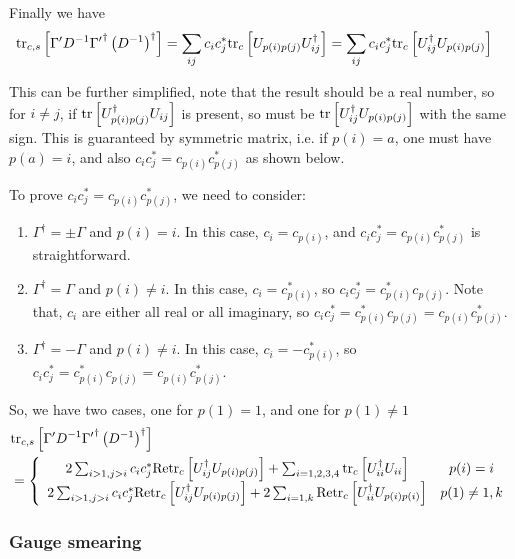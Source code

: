 Finally we have
\begin{equation}
\begin{split}
&{\rm tr}_{c,s}\left[\Gamma ' D^{-1}{\Gamma '}^{\dagger}\left(D^{-1}\right)^{\dagger}\right] = \sum _{ij}c_ic_j^* {\rm tr}_c\left[U_{p(i)p(j)}U^{\dagger}_{ij}\right]=\sum _{ij}c_ic_j^* {\rm tr}_c\left[U^{\dagger}_{ij}U_{p(i)p(j)}\right]
\end{split}
\end{equation}

This can be further simplified, note that the result should be a real number, so for $i\neq j$, if ${\rm tr}\left[U^{\dagger}_{p(i)p(j)}U_{ij}\right]$ is present, so must be ${\rm tr}\left[U^{\dagger}_{ij}U_{p(i)p(j)}\right]$ with the same sign. This is guaranteed by symmetric matrix, i.e. if $p(i)=a$, one must have $p(a)=i$, and also $c_ic^*_j=c_{p(i)}c_{p(j)}^*$ as shown below.

To prove $c_ic^*_j=c_{p(i)}c_{p(j)}^*$, we need to consider:

\begin{enumerate}
  \item $\Gamma ^{\dagger}=\pm \Gamma$ and $p(i)=i$. In this case, $c_i=c_{p(i)}$, and $c_ic^*_j=c_{p(i)}c_{p(j)}^*$ is straightforward.
  \item $\Gamma ^{\dagger}=\Gamma$ and $p(i)\neq i$. In this case, $c_i=c_{p(i)}^*$, so $c_ic^*_j=c^*_{p(i)}c_{p(j)}$. Note that, $c_i$ are either all real or all imaginary, so $c_ic^*_j=c^*_{p(i)}c_{p(j)}=c_{p(i)}c_{p(j)}^*$.
  \item $\Gamma ^{\dagger}=-\Gamma$ and $p(i)\neq i$. In this case, $c_i=-c_{p(i)}^*$, so $c_ic^*_j=c^*_{p(i)}c_{p(j)}=c_{p(i)}c_{p(j)}^*$.
\end{enumerate}

So, we have two cases, one for $p(1)=1$, and one for $p(1)\neq 1$
\begin{equation}
\begin{split}
&{\rm tr}_{c,s}\left[\Gamma ' D^{-1}{\Gamma '}^{\dagger}\left(D^{-1}\right)^{\dagger}\right]\\
& = \left\{\begin{array}{cc}
2\sum _{i>1,j>i}c_ic_j^* {\rm Retr}_c\left[U^{\dagger}_{ij}U_{p(i)p(j)}\right]+\sum _{i=1,2,3,4}{\rm tr}_c\left[U^{\dagger}_{ii}U_{ii}\right] & p(i)=i\\
2\sum _{i>1,j>i}c_ic_j^* {\rm Retr}_c\left[U^{\dagger}_{ij}U_{p(i)p(j)}\right]+2\sum _{i=1,k}{\rm Retr}_c\left[U^{\dagger}_{ii}U_{p(i)p(i)}\right] & p(1)\neq 1,k\\
\end{array}\right.
\end{split}
\end{equation}


\subsubsection{\label{Gauge_Smearing}Gauge smearing}

